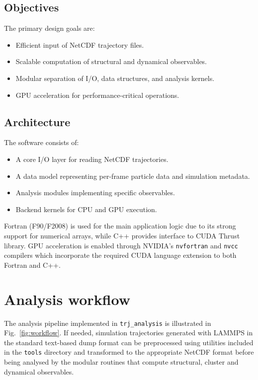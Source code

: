 \documentclass[final,1p,times]{elsarticle}
\begin{document}
\subsection{Objectives}

The primary design goals are:
\begin{itemize}
  \item Efficient input of NetCDF trajectory files.
  \item Scalable computation of structural and dynamical observables.
  \item Modular separation of I/O, data structures, and analysis kernels.
  \item GPU acceleration for performance-critical operations.
\end{itemize}

\subsection{Architecture}

The software consists of:
\begin{itemize}
  \item A core I/O layer for reading NetCDF trajectories.
  \item A data model representing per-frame particle data and simulation metadata.
  \item Analysis modules implementing specific observables.
  \item Backend kernels for CPU and GPU execution.
\end{itemize}

Fortran (F90/F2008) is used for the main application logic due to its
strong support for numerical arrays, while C++ provides interface to
CUDA Thrust library. GPU acceleration is enabled through NVIDIA's
\texttt{nvfortran} and \texttt{nvcc} compilers which incorporate the
required CUDA language extension to both Fortran and C++. 


\section{Analysis workflow}

The analysis pipeline implemented in \texttt{trj\_analysis} is
illustrated in Fig.~\ref{fig:workflow}. If needed, simulation trajectories generated with LAMMPS in the standard text-based dump format can be preprocessed using utilities included in the \texttt{tools} directory and transformed to the appropriate NetCDF format\cite{Rew1990} before being analysed by the modular routines that compute structural, cluster and dynamical observables.
\end{document}
